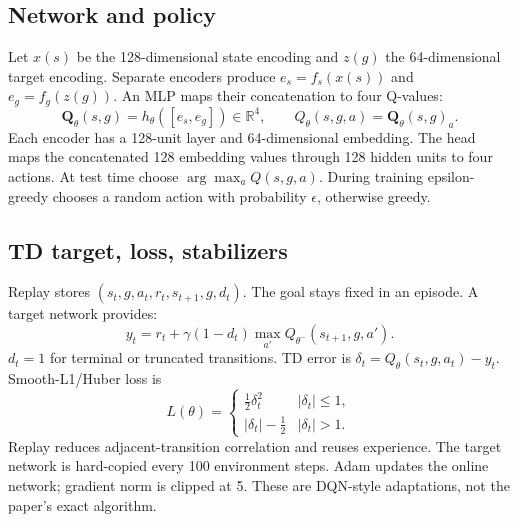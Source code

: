 \documentclass[11pt,a4paper]{article}
\begin{document}
\subsection{Network and policy}
Let $x(s)$ be the 128-dimensional state encoding and $z(g)$ the 64-dimensional target encoding. Separate encoders produce $e_s=f_s(x(s))$ and $e_g=f_g(z(g))$. An MLP maps their concatenation to four Q-values:
\[
\mathbf{Q}_\theta(s,g)=h_\theta([e_s,e_g])\in\mathbb{R}^4,\qquad
Q_\theta(s,g,a)=\mathbf{Q}_\theta(s,g)_a.
\]
Each encoder has a 128-unit layer and 64-dimensional embedding. The head maps the concatenated 128 embedding values through 128 hidden units to four actions. At test time choose $\arg\max_a Q(s,g,a)$. During training epsilon-greedy chooses a random action with probability $\epsilon$, otherwise greedy.

\subsection{TD target, loss, stabilizers}
Replay stores $(s_t,g,a_t,r_t,s_{t+1},g,d_t)$. The goal stays fixed in an episode. A target network provides:
\[
y_t=r_t+\gamma(1-d_t)\max_{a'}Q_{\theta^-}(s_{t+1},g,a').
\]
$d_t=1$ for terminal or truncated transitions. TD error is $\delta_t=Q_\theta(s_t,g,a_t)-y_t$. Smooth-L1/Huber loss is
\[
L(\theta)=\begin{cases}
\frac12\delta_t^2&|\delta_t|\le1,\\
|\delta_t|-\frac12&|\delta_t|>1.
\end{cases}
\]
Replay reduces adjacent-transition correlation and reuses experience. The target network is hard-copied every 100 environment steps. Adam updates the online network; gradient norm is clipped at 5. These are DQN-style adaptations, not the paper's exact algorithm.
\end{document}
